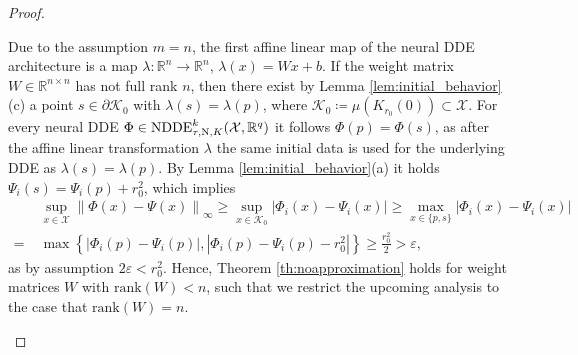 \documentclass[10pt]{article}
\numberwithin{equation}{section}
\newcommand{\eps}{\varepsilon}
\newcommand\norm[1]{\left\lVert#1\right\rVert}
\newcommand\abs[1]{\left\lvert#1\right\rvert}
\begin{document}
\begin{proof}
\begin{enumerate}
			Due to the assumption $m = n$, the first affine linear map of the neural DDE architecture is a map $\lambda: \mathbb{R}^n \rightarrow \mathbb{R}^n$, $\lambda(x) = Wx + b$. If the weight matrix $W \in \mathbb{R}^{n \times n}$ has not full rank $n$, then there exist by Lemma \ref{lem:initial_behavior}(c) a point $s \in \partial \mathcal{K}_0$ with $\lambda(s) = \lambda(p)$, where $\mathcal{K}_0 \coloneqq \mu(K_{r_0}(0))\subset \mathcal{X}$. For every neural DDE $\Phi\in\textup{NDDE}_{\tau,\textup{N},K}^k(\mathcal{X},\mathbb{R}^q)$ it follows $\Phi(p) = \Phi(s)$, as after the affine linear transformation $\lambda$ the same initial data is used for the underlying DDE as $\lambda(s) = \lambda(p)$. By Lemma \ref{lem:initial_behavior}(a) it holds $\Psi_i(s) = \Psi_i(p)+r_0^2$, which implies
			\begin{align*}
				&\sup_{x \in \mathcal{X}}\norm{\Phi(x)-\Psi(x)}_\infty \geq 	\sup_{x\in \mathcal{K}_0}\abs{\Phi_i(x)-\Psi_i(x)}\geq \max_{x\in \{p,s\}}\abs{\Phi_i(x)-\Psi_i(x)} \\
				= \; & \max\left\{ \abs{\Phi_i(p)-\Psi_i(p)}, \abs{\Phi_i(p) - \Psi_i(p)-r_0^2} \right\} \geq \frac{r_0^2}{2}> \eps,
			\end{align*}
			as by assumption $2 \eps < r_0^2$. Hence, Theorem \ref{th:noapproximation} holds for weight matrices $W$ with $\text{rank}(W)<n$, such that we restrict the upcoming analysis to the case that $\text{rank}(W)=n$.
			

\end{enumerate}
\end{proof}
\end{document}
